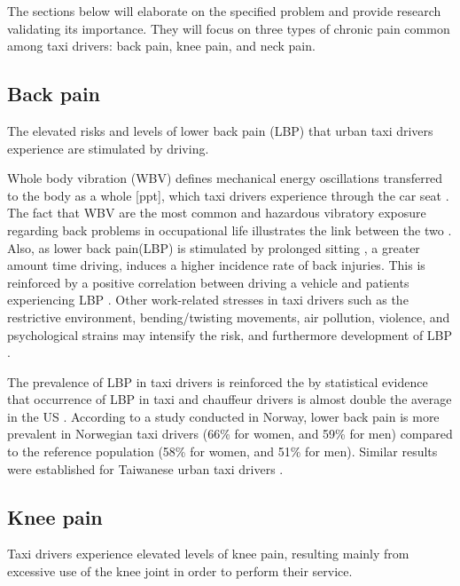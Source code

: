 \documentclass[11pt]{article}
\begin{document}
The sections below will elaborate on the specified problem and provide
research validating its importance. They will focus on three types of
chronic pain common among taxi drivers: back pain, knee pain, and neck
pain. 
\subsection{Back pain}
The elevated risks and levels of lower back pain (LBP) that urban taxi drivers 
experience are stimulated by driving. 

Whole body vibration (WBV) defines mechanical energy oscillations transferred to 
the body as a whole [ppt], which taxi drivers experience \cite{KneePain, Serious} 
through the car seat \cite{ppt}. The fact that WBV are the most common and hazardous 
vibratory exposure regarding back problems in occupational life illustrates the
link between the two \cite{ODrivers@Risk}. Also, as lower back pain(LBP) is stimulated by 
prolonged sitting \cite{Okunribido2008}, a greater amount time driving, induces a 
higher incidence rate of back injuries\cite{Question?}. This is reinforced by a positive 
correlation between driving a vehicle and patients experiencing LBP \cite{ODrivers@Risk}. 
Other work-related stresses in taxi drivers such as the restrictive environment, bending/twisting 
movements, air pollution, violence, and psychological strains may intensify the risk, 
and furthermore development of LBP \cite{KneePain, POSTULATED}. 

The prevalence of LBP in taxi drivers is reinforced the by statistical evidence that occurrence of LBP 
in taxi and chauffeur drivers is almost double the average in the US \cite{68}. According to a study conducted in Norway, lower 
back pain is more prevalent in Norwegian taxi drivers (66\% for women, and 59\% for men) 
compared to the reference population (58\% for women, and 51\% for men). Similar results 
were established for Taiwanese urban taxi drivers \cite{Question?}.

 
\subsection{Knee pain}
Taxi drivers experience elevated levels of knee pain, resulting mainly from excessive use 
of the knee joint in order to perform their service. 
\end{document}
